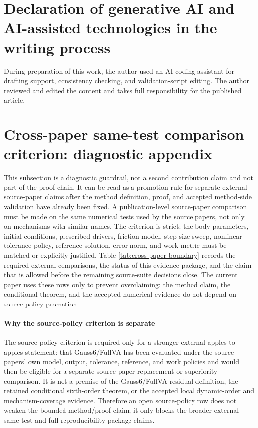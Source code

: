 \documentclass[preprint,12pt]{elsarticle}
\newcommand{\method}{Gauss6\slash FullVA}
\begin{document}
\section*{Declaration of generative AI and AI-assisted technologies in the writing process}

During preparation of this work, the author used an AI coding assistant for
drafting support, consistency checking, and validation-script editing. The
author reviewed and edited the content and takes full responsibility for the
published article.

\appendix

\section{Cross-paper same-test comparison criterion: diagnostic appendix}
\label{sec:cross-paper-boundary}

This subsection is a diagnostic guardrail, not a second contribution claim
and not part of the proof chain. It can be read as a promotion rule for separate
external source-paper claims after the method definition, proof, and accepted
method-side validation have already been fixed. A publication-level
source-paper comparison must be made on the same numerical tests used by the
source papers, not only on mechanisms with similar names. The criterion is
strict:
the body parameters, initial conditions, prescribed drivers, friction model,
step-size sweep, nonlinear tolerance policy, reference solution, error norm,
and work metric must be matched or explicitly justified. Table
\ref{tab:cross-paper-boundary} records the required external comparisons, the
status of this evidence package, and the claim that is allowed before
the remaining source-suite decisions close. The current paper uses these rows
only to prevent overclaiming: the method claim, the conditional theorem, and
the accepted numerical evidence do not depend on source-policy promotion.

\paragraph{Why the source-policy criterion is separate}
The source-policy criterion is required only for a stronger external
apples-to-apples statement: that \method{} has been evaluated under the
source papers' own model, output, tolerance, reference, and work policies and
would then be eligible for a separate source-paper replacement or superiority
comparison.
It is not a premise of the Gauss6/FullVA residual definition, the retained
conditional sixth-order theorem, or the accepted local dynamic-order and
mechanism-coverage evidence.  Therefore an open source-policy row does not
weaken the bounded method/proof claim; it only blocks the broader external
same-test and full reproducibility package claims.
\end{document}
